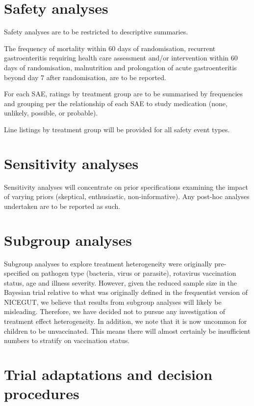 \documentclass[a4paper]{article}
\begin{document}
\section{Safety analyses}

Safety analyses are to be restricted to descriptive summaries.

The frequency of mortality within 60 days of randomisation, recurrent gastroenteritis requiring health care assessment and/or intervention within 60 days of randomisation, malnutrition and prolongation of acute gastroenteritis beyond day 7 after randomisation, are to be reported. 

For each SAE, ratings by treatment group are to be summarised by frequencies and grouping per the relationship of each SAE to study medication (none, unlikely, possible, or probable).

Line listings by treatment group will be provided for all safety event types.

\section{Sensitivity analyses}

Sensitivity analyses will concentrate on prior specifications examining the impact of varying priors (skeptical, enthusiastic, non-informative).
Any post-hoc analyses undertaken are to be reported as such.

\section{Subgroup analyses}

Subgroup analyses to explore treatment heterogeneity were originally pre-specified on pathogen type (bacteria, virus or parasite), rotavirus vaccination status, age and illness severity.
However, given the reduced sample size in the Bayesian trial relative to what was originally defined in the frequentist version of NICEGUT, we believe that results from subgroup analyses will likely be misleading.
Therefore, we have decided not to pursue any investigation of treatment effect heterogeneity.
In addition, we note that it is now uncommon for children to be unvaccinated.
This means there will almost certainly be insufficient numbers to stratify on vaccination status.

\section{Trial adaptations and decision procedures}\label{trial-adaptations-and-decision-procedures}
\end{document}
